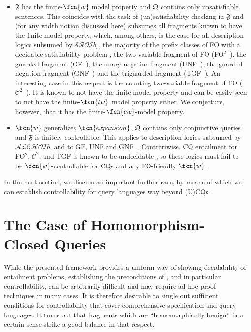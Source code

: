 \begin{itemize}
\item $\mathfrak{F}$ has the finite-$\fcn{w}$ model property and $\mathfrak{Q}$ contains only unsatisfiable sentences. This coincides with the task of (un)satisfiability checking in $\mathfrak{F}$ and (for any width notion discussed here) subsumes all fragments known to have the finite-model property, which, among others, is the case for 
all description logics subsumed by $\mathcal{SROI}b_s$,
the majority of the prefix classes of FO with a decidable satisfiability problem \cite{BorgerGG1997}, 
the two-variable fragment of FO (FO$^2$~\cite{Mortimer75,GradelKV97}),  
the guarded fragment (GF~\cite{AndrekaNB98,Gradel99}), 
the unary negation fragment (UNF~\cite{SegoufinC13}), 
the guarded negation fragment (GNF~\cite{GuardedNegation})
and the triguarded fragment (TGF~\cite{RudolphS18,KieronskiR21}). 
An interesting case in this respect is the counting two-variable fragment of FO ($\mathcal{C}^2$~\cite{GradelOR97}). It is known to not have the finite-model property and can be easily seen to not have the finite-$\fcn{tw}$ model property either. We conjecture, however, that it has the finite-$\fcn{cw}$-model property. 
\item $\fcn{w}$ generalizes $\fcn{expansion}$,  $\mathfrak{Q}$ contains only conjunctive queries and $\mathfrak{F}$ is finitely controllable. This applies to description logics subsumed by $\mathcal{ALCHOI}b$, and to GF, UNF,\linebreak and GNF~\cite{BaranyGO13}. Contrariwise, CQ entailment for FO$^2$\!, $\mathcal{C}^2$\!, and TGF is known to be undecidable \cite{Rosati07}, so these logics must fail to be $\fcn{w}$-controllable for CQs and any FO-friendly $\fcn{w}$.       
\end{itemize}
%
In the next section, we discuss an important further case, by means of which we can establish controllability for query languages way beyond (U)CQs.   

\section{The Case of Homomorphism-Closed Queries}\label{sec:homclosedqueries}

While the presented framework provides a uniform way of showing decidability of entailment problems, establishing the preconditions of , and in particular controllability, can be arbitrarily difficult and may require ad hoc proof techniques in many cases.
It is therefore desirable to single out sufficient conditions for controllability that cover comprehensive specification and query languages. It turns out that fragments which are ``homomorphically benign'' in a certain sense strike a good balance in that respect.

